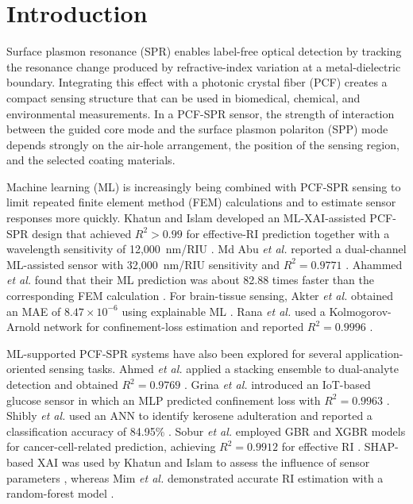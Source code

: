 \documentclass[ACS,STIX2COL]{WileyNJD-v2}
\begin{document}

\maketitle

\section{Introduction}

Surface plasmon resonance (SPR) enables label-free optical detection by tracking the resonance change produced by refractive-index variation at a metal-dielectric boundary\cite{khatun2026ml}. Integrating this effect with a photonic crystal fiber (PCF) creates a compact sensing structure that can be used in biomedical, chemical, and environmental measurements. In a PCF-SPR sensor, the strength of interaction between the guided core mode and the surface plasmon polariton (SPP) mode depends strongly on the air-hole arrangement, the position of the sensing region, and the selected coating materials\cite{md2026smart,ahammed2026machine}.

Machine learning (ML) is increasingly being combined with PCF-SPR sensing to limit repeated finite element method (FEM) calculations and to estimate sensor responses more quickly. Khatun and Islam developed an ML-XAI-assisted PCF-SPR design that achieved $R^2>0.99$ for effective-RI prediction together with a wavelength sensitivity of 12,000~nm/RIU \cite{khatun2026ml}. Md Abu \textit{et al.} reported a dual-channel ML-assisted sensor with 32,000~nm/RIU sensitivity and $R^2=0.9771$ \cite{md2026smart}. Ahammed \textit{et al.} found that their ML prediction was about 82.88 times faster than the corresponding FEM calculation \cite{ahammed2026machine}. For brain-tissue sensing, Akter \textit{et al.} obtained an MAE of $8.47\times10^{-6}$ using explainable ML \cite{akter2026neuropcf}. Rana \textit{et al.} used a Kolmogorov-Arnold network for confinement-loss estimation and reported $R^2=0.9996$ \cite{rana2026ultralow}.

ML-supported PCF-SPR systems have also been explored for several application-oriented sensing tasks. Ahmed \textit{et al.} applied a stacking ensemble to dual-analyte detection and obtained $R^2=0.9769$ \cite{ahmed2026simultaneous}. Grina \textit{et al.} introduced an IoT-based glucose sensor in which an MLP predicted confinement loss with $R^2=0.9963$ \cite{grina2026iot}. Shibly \textit{et al.} used an ANN to identify kerosene adulteration and reported a classification accuracy of 84.95\% \cite{shibly2026dual}. Sobur \textit{et al.} employed GBR and XGBR models for cancer-cell-related prediction, achieving $R^2=0.9912$ for effective RI \cite{sobur2025machine}. SHAP-based XAI was used by Khatun and Islam to assess the influence of sensor parameters \cite{khatun2025design}, whereas Mim \textit{et al.} demonstrated accurate RI estimation with a random-forest model \cite{mim2025advanced}.
\end{document}
